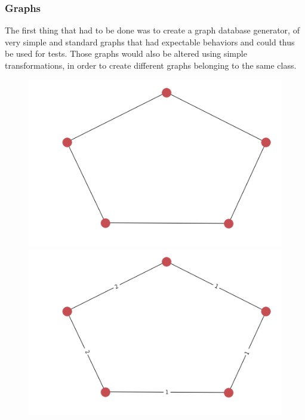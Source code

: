 \documentclass{article}
\theoremstyle{definition}
\begin{document}
\subsubsection{Graphs}
The first thing that had to be done was to create a graph database generator, of very simple and standard graphs that had expectable behaviors and could thus be used for tests. Those graphs would also be altered using simple transformations, in order to create different graphs belonging to the same class.\\
\begin{figure}[!htb]
	\begin{multicols}{4}
		\includegraphics[width=\linewidth]{data/generated-graphs/ring_base.png}\par
		\includegraphics[width=\linewidth]{data/generated-graphs/ring_labels.png}\par

\end{multicols}
\end{figure}
\end{document}

